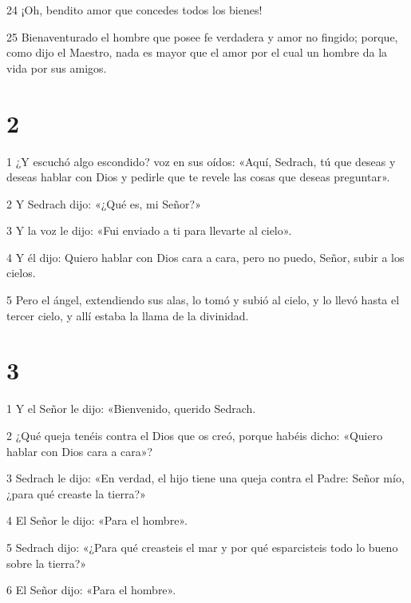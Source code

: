 \par 24 ¡Oh, bendito amor que concedes todos los bienes!

\par 25 Bienaventurado el hombre que posee fe verdadera y amor no fingido; porque, como dijo el Maestro, nada es mayor que el amor por el cual un hombre da la vida por sus amigos.

\chapter{2}

\par 1 ¿Y escuchó algo escondido? voz en sus oídos: «Aquí, Sedrach, tú que deseas y deseas hablar con Dios y pedirle que te revele las cosas que deseas preguntar».

\par 2 Y Sedrach dijo: «¿Qué es, mi Señor?»

\par 3 Y la voz le dijo: «Fui enviado a ti para llevarte al cielo».

\par 4 Y él dijo: Quiero hablar con Dios cara a cara, pero no puedo, Señor, subir a los cielos.

\par 5 Pero el ángel, extendiendo sus alas, lo tomó y subió al cielo, y lo llevó hasta el tercer cielo, y allí estaba la llama de la divinidad.

\chapter{3}

\par 1 Y el Señor le dijo: «Bienvenido, querido Sedrach.

\par 2 ¿Qué queja tenéis contra el Dios que os creó, porque habéis dicho: «Quiero hablar con Dios cara a cara»?

\par 3 Sedrach le dijo: «En verdad, el hijo tiene una queja contra el Padre: Señor mío, ¿para qué creaste la tierra?»

\par 4 El Señor le dijo: «Para el hombre».

\par 5 Sedrach dijo: «¿Para qué creasteis el mar y por qué esparcisteis todo lo bueno sobre la tierra?»

\par 6 El Señor dijo: «Para el hombre».

